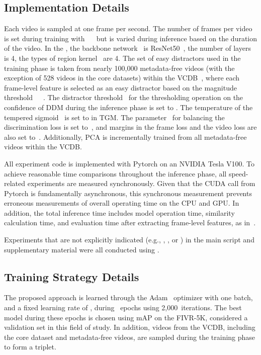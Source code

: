 \documentclass[10pt,twocolumn,letterpaper]{article}
\begin{document}
    \subsection{Implementation Details}\label{imple}
        Each video is sampled at one frame per second. The number of frames per video is set during training with ~~ but is varied during inference based on the duration of the video. In the , the backbone network~ is ResNet50~\cite{he2016deep}, the number of layers~ is 4, the types of region kernel~ are 4. The set of easy distractors used in the training phase is taken from nearly 100,000 metadata-free videos (with the exception of 528 videos in the core datasets) within the VCDB~\cite{jiang2014vcdb}, where each frame-level feature is selected as an easy distractor based on the magnitude threshold~~~. The distractor threshold~ for the thresholding operation on the confidence of DDM during the inference phase is set to . The temperature of the tempered sigmoid~\cite{papernot2021tempered} is set to  in TGM. The parameter~ for balancing the discrimination loss is set to~, and margins in the frame loss and the video loss are also set to~. Additionally, PCA is incrementally trained from all metadata-free videos within the VCDB.
        
        All experiment code is implemented with Pytorch on an NVIDIA Tesla V100. To achieve reasonable time comparisons throughout the inference phase, all speed-related experiments are measured synchronously. Given that the CUDA call from Pytorch is fundamentally asynchronous, this synchronous measurement prevents erroneous measurements of overall operating time on the CPU and GPU. In addition, the total inference time includes model operation time, similarity calculation time, and evaluation time after extracting frame-level features, as in~\cite{ng2022vrag}.

        Experiments that are not explicitly indicated (e.g., , , or ) in the main script and supplementary material were all conducted using .

    \subsection{Training Strategy Details}\label{strategy}
        The proposed approach is learned through the Adam~\cite{kingma2014adam} optimizer with one batch, and a fixed learning rate of , during ~epochs using 2,000~iterations. The best model during these epochs is chosen using mAP on the FIVR-5K, considered a validation set in this field of study. In addition, videos from the VCDB, including the core dataset and metadata-free videos, are sampled during the training phase to form a triplet.
        
\end{document}
